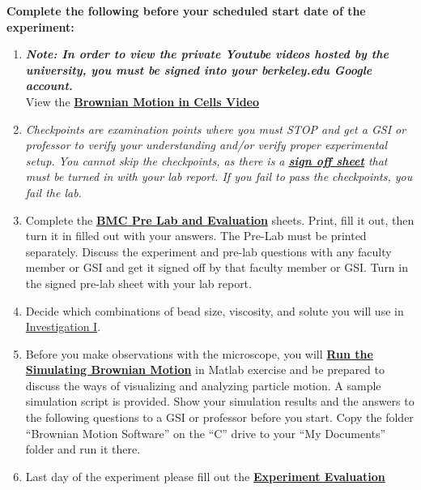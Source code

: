 \documentclass{../lab}
\begin{document}
\textbf{Complete the following before your scheduled start date of the experiment:}

\begin{enumerate}
    \item \emph{\textbf{Note: In order to view the private Youtube videos hosted by the university, you must be signed into your berkeley.edu Google account.}} \\
    View the \href{http://youtu.be/XJ6YBTL6euc}{\textbf{Brownian Motion in Cells Video}}

    \item \emph{Checkpoints are examination points where you must STOP and get a GSI or professor to verify your understanding and/or verify proper experimental setup. You cannot skip the checkpoints, as there is a \href{http://experimentationlab.berkeley.edu/bmccheckpoints}{\textbf{sign off sheet}} that must be turned in with your lab report. If you fail to pass the checkpoints, you fail the lab.}

    \item Complete the \href{http://experimentationlab.berkeley.edu/BMCPreLab}{\textbf{BMC Pre Lab and Evaluation}} sheets. Print, fill it out, then turn it in filled out with your answers. The Pre-Lab must be printed separately. Discuss the experiment and pre-lab questions with any faculty member or GSI and get it signed off by that faculty member or GSI. Turn in the signed pre-lab sheet with your lab report.

    \item Decide which combinations of bead size, viscosity, and solute you will use in  \hyperref[sec:InvestigationI]{Investigation I}.

    \item Before you make observations with the microscope, you will \href{http://experimentationlab.berkeley.edu/node/83}{\textbf{Run the Simulating Brownian Motion}} in Matlab exercise and be prepared to discuss the ways of visualizing and analyzing particle motion.  A sample simulation script is provided. Show your simulation results and the answers to the following questions to a GSI or professor before you start. Copy the folder ``Brownian Motion Software'' on the ``C'' drive to your ``My Documents'' folder and run it there.

    \item Last day of the experiment please fill out the \href{\ExperimentEvaluation}{\textbf{Experiment Evaluation}}
\end{enumerate}
\end{document}
